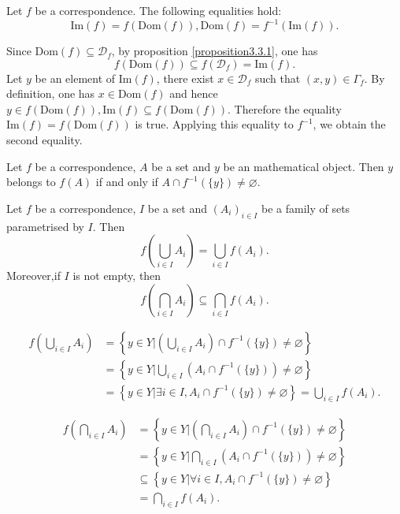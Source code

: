 \documentclass{book}
\numberwithin{equation}{section}
\begin{document}
\begin{propositionenv}\label{proposition3.3.2}
    Let $f$ be a correspondence. The following equalities hold:
    $$\mathrm{Im}(f)=f(\mathrm{Dom}(f)),\mathrm{Dom}(f)=f^{-1}(\mathrm{Im}(f)).$$
\end{propositionenv}
\begin{proofenv}
    Since $\mathrm{Dom}(f)\subseteq\mathscr{D}_f$, by proposition \ref{proposition3.3.1}, one has 
    $$f(\mathrm{Dom}(f))\subseteq f(\mathscr{D}_f)=\mathrm{Im}(f).$$
    Let $y$ be an element of $\mathrm{Im}(f)$, there exist $x\in \mathscr{D}_f$ such that $(x,y)\in \Gamma_f$. By definition, one has $x\in \mathrm{Dom }(f)$ and hence $y\in f(\mathrm{Dom }(f)),\mathrm{Im}(f)\subseteq f(\mathrm{Dom }(f))$. Therefore the equality $\mathrm{Im}(f)=f(\mathrm{Dom}(f))$ is true. Applying this equality to $f^{-1}$, we obtain the second equality.
\end{proofenv}
\begin{propositionenv}
    Let $f$ be a correspondence, $A$ be a set and $y$ be an mathematical object. Then $y$ belongs to $f(A)$ if and only if $A\cap f^{-1}(\{y\})\not=\varnothing$.
\end{propositionenv}
\begin{propositionenv}\label{proposition3.3.4}
    Let $f$ be a correspondence, $I$ be a set and $(A_i)_{i\in I}$ be a family of sets parametrised by $I$. Then
    $$f\left( \bigcup_{i\in I}A_i\right)=\bigcup_{i\in I}f(A_i).$$
    Moreover,if $I$ is not empty, then 
    $$f\left( \bigcap_{i\in I}A_i\right)\subseteq \bigcap_{i\in I}f(A_i).$$

\end{propositionenv}
\begin{proofenv}
   \begin{align*}
         f\left( \bigcup_{i\in I}A_i\right)&=\left\{ y\in Y|\left( \bigcup_{i\in I}A_i\right)\cap f^{-1}(\{y\})\not=\varnothing  \right\}\\
        &=\left\{ y\in Y|\bigcup_{i\in I}\left(A_i\cap f^{-1}(\{y\})\right)\not=\varnothing  \right\}\\
        &=\left\{y\in Y|\exists i \in I,A_i\cap f^{-1}(\{y\})\not =\varnothing\right\}=\bigcup_{i\in I}f(A_i).
   \end{align*}

    \begin{align*}
        f\left(\bigcap_{i\in I}A_i \right)&=\left\{ y\in Y|\left( \bigcap_{i\in I}A_i\right) \cap f^{-1}(\{y\})\not=\varnothing\right\}\\
        &=\left\{ y\in Y| \bigcap_{i\in I}\left(A_i \cap f^{-1}(\{y\})\right)\not=\varnothing\right\}\\
        &\subseteq \left\{  y\in Y|\forall i\in I, A_i\cap f^{-1}(\{y\})\not=\varnothing\right\}\\
        &=\bigcap_{i\in I}f(A_i).
    \end{align*}
\end{proofenv}
\end{document}

